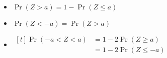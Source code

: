 \documentclass[12pt,a4paper,titlepage]{article}
\begin{document}
\begin{SummaryBox}[title=The standard normal distribution, breakable]
                \begin{SummaryExtensionBox}[title=Symmetry properties of the standard normal distribution]
                    \begin{itemize}[leftmargin=*]
                        \item $\Pr(Z > a) = 1 - \Pr(Z \leq a)$
                        \item $\Pr(Z < -a) = \Pr(Z > a)$
                        \item $\begin{aligned}[t] \Pr(-a < Z < a) &= 1 - 2\Pr(Z \geq a) \\ &= 1 - 2\Pr(Z \leq -a) \end{aligned}$
                    \end{itemize}
                \end{SummaryExtensionBox}
            \end{SummaryBox}
            
\end{document}
